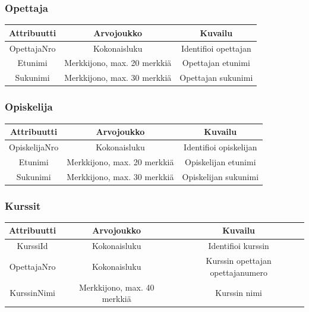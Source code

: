 \documentclass[12pt,twoside,a4paper,leqno,titlepage]{article}
\begin{document}
\subsubsection*{Opettaja}

\begin{tabular}{|c|c|c|}
  \hline
  \textbf{Attribuutti} & \textbf{Arvojoukko} & \textbf{Kuvailu} \\
  \hline
  OpettajaNro & Kokonaisluku & Identifioi opettajan \\
  \hline
  Etunimi & Merkkijono, max. 20 merkkiä & Opettajan etunimi \\
  \hline
  Sukunimi & Merkkijono, max. 30 merkkiä & Opettajan sukunimi \\
  \hline
\end{tabular}

\subsubsection*{Opiskelija}

\begin{tabular}{|c|c|c|}
  \hline
  \textbf{Attribuutti} & \textbf{Arvojoukko} & \textbf{Kuvailu} \\
  \hline
  OpiskelijaNro & Kokonaisluku & Identifioi opiskelijan \\
  \hline
  Etunimi & Merkkijono, max. 20 merkkiä & Opiskelijan etunimi \\
  \hline
  Sukunimi & Merkkijono, max. 30 merkkiä & Opiskelijan sukunimi \\
  \hline
\end{tabular}

\subsubsection*{Kurssit}

\begin{tabular}{|c|c|c|}
  \hline
  \textbf{Attribuutti} & \textbf{Arvojoukko} & \textbf{Kuvailu} \\
  \hline
  KurssiId & Kokonaisluku & Identifioi kurssin \\
  \hline
  OpettajaNro & Kokonaisluku & Kurssin opettajan opettajanumero \\
  \hline
  KurssinNimi & Merkkijono, max. 40 merkkiä & Kurssin nimi \\
  \hline
\end{tabular}
\end{document}

